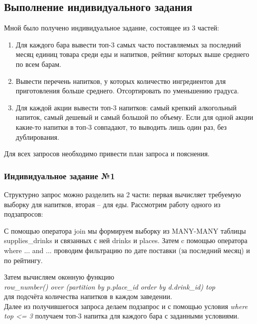 \subsection{Выполнение индивидуального задания}

Мной было получено индивидуальное задание, состоящее из 3 частей:
\begin{enumerate}
	\item Для каждого бара вывести топ-3 самых часто поставляемых за последний месяц единиц товара среди еды и напитков, рейтинг которых выше среднего по всем барам.
	\item Вывести перечень напитков, у которых количество ингредиентов для приготовления больше среднего. Отсортировать по уменьшению градуса.
	\item Для каждой акции вывести топ-3 напитков: самый крепкий алкогольный напиток, самый дешевый и самый большой по объему. Если для одной акции какие-то напитки в топ-3 совпадают, то выводить лишь один раз, без дублирования.
\end{enumerate}

Для всех запросов необходимо привести план запроса и пояснения.
\subsubsection{Индивидуальное задание №1}
Структурно запрос можно разделить на 2 части: первая вычисляет требуемую выборку для напитков, вторая -- для еды.
Рассмотрим работу одного из подзапросов:

С помощью оператора join мы формируем выборку из MANY-MANY таблицы supplies\_drinks и связанных с ней drinks и places. Затем c помощью оператора where ... and ... проводим фильтрацию по дате поставки (за последний месяц) и по рейтингу.

Затем вычисляем оконную функцию\\
\textit{row\_number() over (partition by p.place\_id order by d.drink\_id) top}\\
для подсчёта количества напитков в каждом заведении.\\
Далее из получившегося запроса делаем подзапрос и с помощью условия \textit{where top <= 3} получаем топ-3 напитка для каждого бара с заданными условиями.

\newpage


